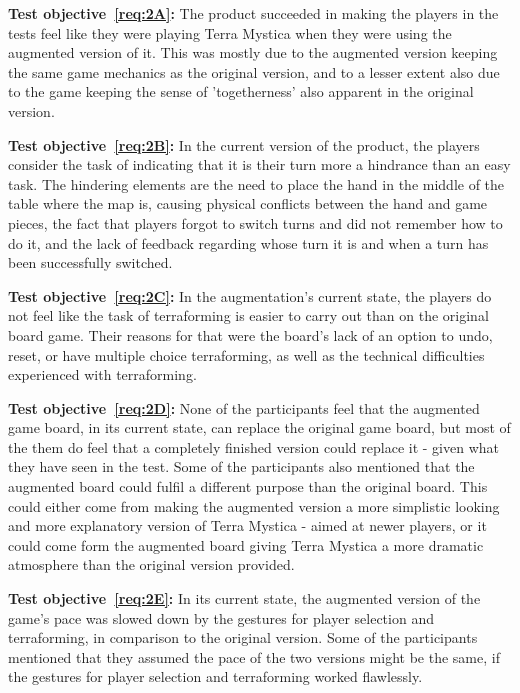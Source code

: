 \textbf{Test objective~\ref{req:2A}:} The product succeeded in making the players in the tests feel like they were playing Terra Mystica when they were using the augmented version of it. This was mostly due to the augmented version keeping the same game mechanics as the original version, and to a lesser extent also due to the game keeping the sense of 'togetherness' also apparent in the original version.

\textbf{Test objective~\ref{req:2B}:} In the current version of the product, the players consider the task of indicating that it is their turn more a hindrance than an easy task. The hindering elements are the need to place the hand in the middle of the table where the map is, causing physical conflicts between the hand and game pieces, the fact that players forgot to switch turns and did not remember how to do it, and the lack of feedback regarding whose turn it is and when a turn has been successfully switched. 

\textbf{Test objective~\ref{req:2C}:} In the augmentation's current state, the players do not feel like the task of terraforming is easier to carry out than on the original board game. Their reasons for that were the board's lack of an option to undo, reset, or have multiple choice terraforming, as well as the technical difficulties experienced with terraforming. 

\textbf{Test objective~\ref{req:2D}:} None of the participants feel that the augmented game board, in its current state, can replace the original game board, but most of the them do feel that a completely finished version could replace it - given what they have seen in the test. Some of the participants also mentioned that the augmented board could fulfil a different purpose than the original board. This could either come from making the augmented version a more simplistic looking and more explanatory version of Terra Mystica - aimed at newer players, or it could come form the augmented board giving Terra Mystica a more dramatic atmosphere than the original version provided.

\textbf{Test objective~\ref{req:2E}:} In its current state, the augmented version of the game's pace was slowed down by the gestures for player selection and terraforming, in comparison to the original version. Some of the participants mentioned that they assumed the pace of the two versions might be the same, if the gestures for player selection and terraforming worked flawlessly. 